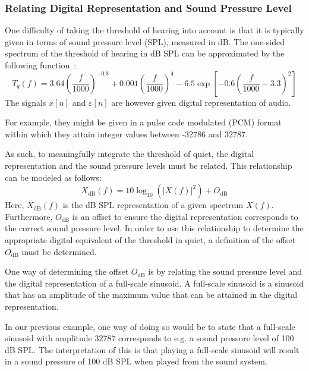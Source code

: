 \subsubsection{Relating Digital Representation and Sound Pressure Level}
\label{ch:perceptual:implementation:calibration:sound_pressure_level}
One difficulty of taking the threshold of hearing into account is that it is typically given in terms of sound pressure level (SPL), measured in dB. 
The one-sided spectrum of the threshold of hearing in dB SPL can be approximated by the following function~\cite{painter2000perceptual}:
\begin{equation}
    T_q(f) = 3.64\left(\frac{f}{1000}\right)^{-0.8} + 0.001\left(\frac{f}{1000}\right)^4 - 6.5\exp\left[-0.6\left(\frac{f}{1000}-3.3\right)^2\right]
\end{equation}
The signals $x[n]$ and $\varepsilon[n]$ are however given digital representation of audio. 

For example, they might be given in a pulse code modulated (PCM) format within which they attain integer values between -32786 and 32787.

As such, to meaningfully integrate the threshold of quiet, the digital representation and the sound pressure levels must be related.
This relationship can be modeled as follows:
\begin{equation}
    X_\text{dB}(f) = 10\log_{10}(\left|X(f)\right|^2) + O_\text{dB}
    \label{eq:perceptual:implementation:calibration:sound_pressure_level:dB_representation}
\end{equation}
Here, $X_\text{dB}(f)$ is the dB SPL representation of a given spectrum $X(f)$.
Furthermore, $O_\text{dB}$ is an offset to ensure the digital representation corresponds to the correct sound pressure level. 
In order to use this relationship to determine the appropriate digital equivalent of the threshold in quiet, a definition of the offset $O_\text{dB}$
must be determined.

One way of determining the offset $O_\text{dB}$ is by relating the sound pressure level and the digital representation of a full-scale sinusoid.
A full-scale sinusoid is a sinusoid that has an amplitude of the maximum value that can be attained in the digital representation.

In our previous example, one way of doing so would be to state that a full-scale sinusoid with amplitude 32787 corresponds to 
e.g. a sound pressure level of 100 dB SPL.
The interpretation of this is that playing a full-scale sinusoid will result in a sound pressure of 100 dB SPL when played from the sound system.

